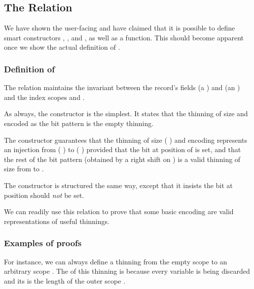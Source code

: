 \subsection{The  Relation}\label{sec:thininginternal}

We have shown the user-facing  and have claimed that it is possible
to define smart constructors , ,
and , as well as a  function.
%
This should become apparent once we show the actual definition of .

\subsubsection{Definition of }

The relation maintains the invariant between the record's
fields  (a )
and  (an )
and the index scopes  and .


As always, the  constructor is the simplest.
%
It states that the thinning of size  and encoded as the bit
pattern  is the empty thinning.

The  constructor guarantees that the thinning of
size ( ) and encoding 
represents an injection
from ( \IdrisData{:<} )
to ( \IdrisData{:<} )
provided that the bit at position  of 
is set, and that the rest of the bit pattern (obtained by a right shift
on ) is a valid thinning of size  from
 to .

The  constructor is structured the same way, except that
it insists the bit at position  should \emph{not} be set.

We can readily use this relation to prove that some basic encoding are
valid representations of useful thinnings.

\subsubsection{Examples of  proofs}

For instance, we can always define a thinning from the empty scope to
an arbitrary scope .
%
The  of this thinning is  because
every variable is being discarded and its  is
the length of the outer scope .

